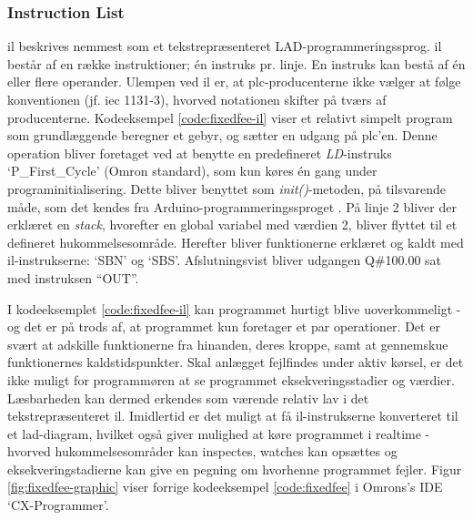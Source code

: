 \subsubsection{Instruction List}
\gls{il} beskrives nemmest som et tekstrepræsenteret LAD-programmeringssprog. \gls{il} består af en række instruktioner; én instruks pr. linje. En instruks kan bestå af én eller flere operander. Ulempen ved \gls{il} er, at \gls{plc}-producenterne ikke vælger at følge konventionen (jf. \gls{iec} 1131-3), hvorved notationen skifter på tværs af producenterne. Kodeeksempel \ref{code:fixedfee-il} viser et relativt simpelt program som grundlæggende beregner et gebyr, og sætter en udgang på \gls{plc}'en. Denne operation bliver foretaget ved at benytte en predefineret \textit{LD}-instruks \enquote*{P\_First\_Cycle} (Omron standard), som kun køres én gang under programinitialisering. Dette bliver benyttet som \textit{init()}-metoden, på tilsvarende måde, som det kendes fra Arduino-programmeringssproget \cite{ardiono_code_init}. På linje 2 bliver der erklæret en \textit{stack}, hvorefter en global variabel med værdien 2, bliver flyttet til et defineret hukommelsesområde. Herefter bliver funktionerne erklæret og kaldt med \gls{il}-instrukserne: \enquote*{SBN} og \enquote*{SBS}. Afslutningsvist bliver udgangen Q\#100.00 sat med instruksen \enquote{OUT}. 


\noindent I kodeeksemplet \ref{code:fixedfee-il} kan programmet hurtigt blive uoverkommeligt - og det er på trods af, at programmet kun foretager et par operationer. Det er svært at adskille funktionerne fra hinanden, deres kroppe, samt at gennemskue funktionernes kaldstidspunkter. Skal anlægget fejlfindes under aktiv kørsel, er det ikke muligt for programmøren at se programmet eksekveringsstadier og værdier. Læsbarheden kan dermed erkendes som værende relativ lav i det tekstrepræsenteret \gls{il}. Imidlertid er det muligt at få \gls{il}-instrukserne konverteret til et \gls{lad}-diagram, hvilket også giver mulighed at køre programmet i realtime - hvorved hukommelsesområder kan inspectes, watches kan opsættes og eksekveringstadierne kan give en pegning om hvorhenne programmet fejler. Figur \ref{fig:fixedfee-graphic} viser forrige kodeeksempel \ref{code:fixedfee} i Omrons's IDE \enquote*{CX-Programmer}.

